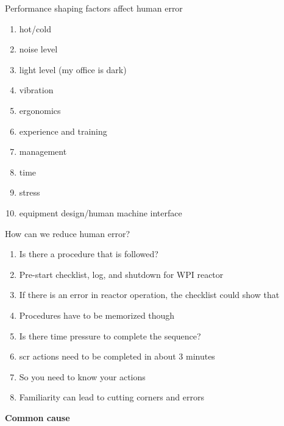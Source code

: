 \documentclass[aspectratio=1610,pdftex,dvipsnames,compress,xcolor={dvipsnames}]{beamer}
\newcommand{\acs}{\acrshort} %
\begin{document}
\begin{frame}{Performance shaping factors affect human error}
    \begin{enumerate}[series=outerlist,topsep=0pt,itemsep=3pt,leftmargin=*,label=(\arabic*)]
        \item[]hot/cold  
        \item[]noise level   
        \item[]light level (my office is dark)  
        \item[]vibration  
        \item[]ergonomics
        \item[]experience and training
        \item[]management
        \item[]time
        \item[]stress
        \item[]equipment design/human machine interface
    \end{enumerate}
\end{frame}


\begin{frame}{How can we reduce human error?}
    \begin{enumerate}[series=outerlist,topsep=0pt,itemsep=15pt,leftmargin=*,label=(\arabic*)]
        \item[]Is there a procedure that is followed?  
        \item[]Pre-start checklist, log, and shutdown for WPI reactor  
        \item[]If there is an error in reactor operation, the checklist could show that  
        \item[]Procedures have to be memorized though
        \item[]Is there time pressure to complete the sequence?  
        \item[]\acs{scr} actions need to be completed in about 3 minutes
        \item[]So you need to know your actions  
        \item[]Familiarity can lead to cutting corners and errors  
    \end{enumerate}
\end{frame}


\begin{frame}[plain]{}
    \centering\LARGE\textbf{Common cause}
\end{frame}
\end{document}
